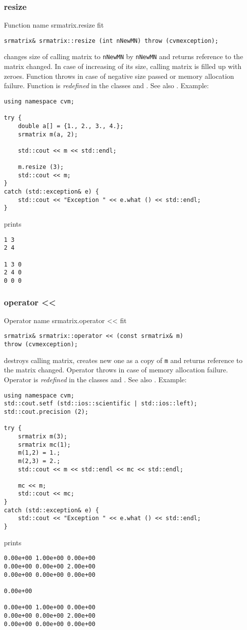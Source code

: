 \subsubsection{resize}
Function%
\pdfdest name {srmatrix.resize} fit
\begin{verbatim}
srmatrix& srmatrix::resize (int nNewMN) throw (cvmexception);
\end{verbatim}
changes  size of  calling matrix to \verb"nNewMN" by \verb"nNewMN"
and returns  reference to
the matrix changed. In case of increasing of its size, calling matrix
is filled up with zeroes.
Function throws  
in case of negative size passed or memory allocation failure.
Function is \emph{redefined} in the classes
and .
See also .
Example:
\begin{Verbatim}
using namespace cvm;

try {
    double a[] = {1., 2., 3., 4.};
    srmatrix m(a, 2);

    std::cout << m << std::endl;

    m.resize (3);
    std::cout << m;
}
catch (std::exception& e) {
    std::cout << "Exception " << e.what () << std::endl;
}
\end{Verbatim}
prints
\begin{Verbatim}
1 3
2 4

1 3 0
2 4 0
0 0 0
\end{Verbatim}
\newpage



\subsubsection{operator <{}<}
Operator%
\pdfdest name {srmatrix.operator <<} fit
\begin{verbatim}
srmatrix& srmatrix::operator << (const srmatrix& m)
throw (cvmexception);
\end{verbatim}
destroys  calling matrix, creates  new one as a copy of \verb"m"
and returns  reference to
the matrix changed.
Operator throws  
in case of memory allocation failure.
Operator is \emph{redefined} in the classes
and .
See also .
Example:
\begin{Verbatim}
using namespace cvm;
std::cout.setf (std::ios::scientific | std::ios::left); 
std::cout.precision (2);

try {
    srmatrix m(3);
    srmatrix mc(1);
    m(1,2) = 1.;
    m(2,3) = 2.;
    std::cout << m << std::endl << mc << std::endl;

    mc << m;
    std::cout << mc;
}
catch (std::exception& e) {
    std::cout << "Exception " << e.what () << std::endl;
}
\end{Verbatim}
prints
\begin{Verbatim}
0.00e+00 1.00e+00 0.00e+00
0.00e+00 0.00e+00 2.00e+00
0.00e+00 0.00e+00 0.00e+00

0.00e+00

0.00e+00 1.00e+00 0.00e+00
0.00e+00 0.00e+00 2.00e+00
0.00e+00 0.00e+00 0.00e+00
\end{Verbatim}
\newpage



